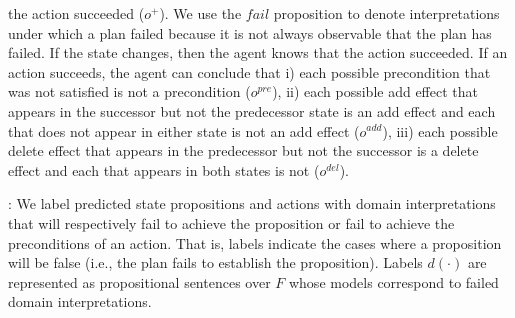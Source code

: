 \documentclass{article}
\def\und#1{\noindent{\bf #1}:}
\begin{document}
the action succeeded ($o^+$).  We use the $fail$ proposition to denote
interpretations under which a plan failed because it is not always observable
that the plan has failed. If the state changes, then the agent knows that the
action succeeded. If an action  succeeds, the agent can conclude that i) each possible precondition that was not satisfied is not a precondition ($o^{pre}$), ii) each possible add effect that
appears in the successor but not the predecessor state is an add effect and each that does not appear in either state is not an add 
effect ($o^{add}$), iii) each possible delete effect that appears in the
predecessor but not the successor is a delete effect and each that  appears in both states is
not ($o^{del}$).



\und{Planning} We label predicted state propositions and actions with domain
interpretations that will respectively fail to achieve the proposition or fail
to achieve the preconditions of an action.  That is, labels indicate the cases
where a proposition will be false (i.e., the plan fails to establish the
proposition). Labels $d(\cdot)$ are represented as  propositional sentences over
$F$ whose models correspond to failed domain interpretations.
\end{document}
